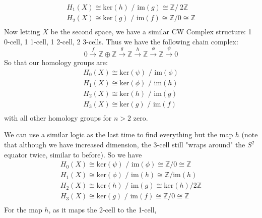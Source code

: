 \documentclass[12pt]{article}
\newcommand{\Z}{\mathbb{Z}}
\begin{document}
\begin{newproof}
\begin{align*}
    H_1(X) \cong \text{ker}(h) \text{ / im}(g) \cong \Z / \ 2\Z \\
    H_2(X) \cong \text{ker}(g) \text{ / im}(f) \cong \Z / 0 \cong \Z\\
  \end{align*}
  Now letting $X$ be the second space, we have a similar CW Complex structure: 1 0-cell, 1 1-cell, 1 2-cell, 2 3-cells. Thus we have the 
  following chain complex:
  $$ 0 \xrightarrow{f} \Z \oplus \Z \xrightarrow{g} \Z \xrightarrow{h} \Z \xrightarrow{\phi} \Z \xrightarrow{\psi} 0 $$
  So that our homology groups are:
  \begin{align*}
    H_0(X) \cong \text{ker}(\psi) \text{ / im}(\phi) \\
    H_1(X) \cong \text{ker}(\phi) \text{ / im}(h) \\
    H_2(X) \cong \text{ker}(h) \text{ / im}(g) \\
    H_3(X) \cong \text{ker}(g) \text{ / im}(f) \\
  \end{align*}
  with all other homology groups for $n > 2$ zero.
  \par We can use a similar logic as the last time to find everything but the map $h$ (note that although we have increased 
  dimension, the 3-cell still "wraps around" the $S^2$ equator twice, similar to before). So we have 
  \begin{align*}
    H_0(X) \cong \text{ker}(\psi) \text{ / im}(\phi) \cong \Z / 0 \cong \Z \\
    H_1(X) \cong \text{ker}(\phi) \text{ / im}(h) \cong \Z /\text{im}(h) \\
    H_2(X) \cong \text{ker}(h) \text{ / im}(g) \cong \text{ker}(h) / 2\Z \\
    H_3(X) \cong \text{ker}(g) \text{ / im}(f) \cong \Z / 0 \cong \Z \\
  \end{align*}
  For the map $h$, as it maps the 2-cell to the 1-cell, 
\end{newproof}
\end{document}
